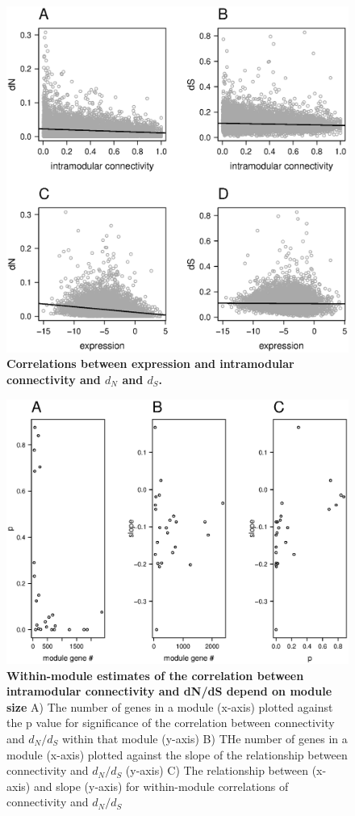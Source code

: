 \begin{figure}[ht!]
      \centering
       \includegraphics[width=\linewidth]{Ch4FigCorr}
    \caption{\textbf{Correlations between expression and intramodular connectivity and $d_{N}$ and $d_{S}$.}}
    \label{fig:fsCorr}
\end{figure}


\begin{figure}[ht!]
      \centering
       \includegraphics[width=\linewidth]{Ch4FigMod}
    \caption{\textbf{ Within-module estimates of the correlation between intramodular connectivity and dN/dS depend on module size} A) The number of genes in a module (x-axis) plotted against the p value for significance of the correlation between connectivity and $d_{N}/d_{S}$ within that module (y-axis) B) THe number of genes in a module (x-axis) plotted against the slope of the relationship between connectivity and $d_{N}/d_{S}$ (y-axis) C) The relationship between (x-axis) and slope (y-axis) for within-module correlations of connectivity and $d_{N}/d_{S}$}
    \label{fig:fsMod}
\end{figure}




